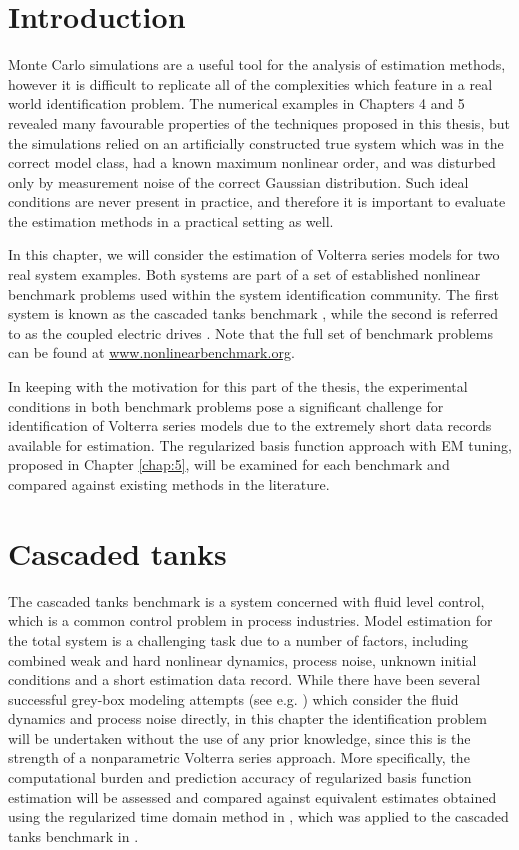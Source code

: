 \section{Introduction}

Monte Carlo simulations are a useful tool for the analysis of estimation methods, however it is difficult to replicate all of the complexities which feature in a real world identification problem. The numerical examples in Chapters 4 and 5 revealed many favourable properties of the techniques proposed in this thesis, but the simulations relied on an artificially constructed true system which was in the correct model class, had a known maximum nonlinear order, and was disturbed only by measurement noise of the correct Gaussian distribution. Such ideal conditions are never present in practice, and therefore it is important to evaluate the estimation methods in a practical setting as well.

In this chapter, we will consider the estimation of Volterra series models for two real system examples. Both systems are part of a set of established nonlinear benchmark problems used within the system identification community. The first system is known as the cascaded tanks benchmark \cite{Schoukens2016c}, while the second is referred to as the coupled electric drives \cite{Wigren2017}. Note that the full set of benchmark problems can be found at \url{www.nonlinearbenchmark.org}. 

In keeping with the motivation for this part of the thesis, the experimental conditions in both benchmark problems pose a significant challenge for identification of Volterra series models due to the extremely short data records available for estimation. The regularized basis function approach with EM tuning, proposed in Chapter \ref{chap:5}, will be examined for each benchmark and compared against existing methods in the literature.  

\section{Cascaded tanks}

The cascaded tanks benchmark \cite{Schoukens2016c} is a system concerned with fluid level control, which is a common control problem in process industries. Model estimation for the total system is a challenging task due to a number of factors, including combined weak and hard nonlinear dynamics, process noise, unknown initial conditions and a short estimation data record. While there have been several successful grey-box modeling attempts (see e.g. \cite{Pan2018}) which consider the fluid dynamics and process noise directly, in this chapter the identification problem will be undertaken without the use of any prior knowledge, since this is the strength of a nonparametric Volterra series approach. More specifically, the computational burden and prediction accuracy of regularized basis function estimation will be assessed and compared against equivalent estimates obtained using the regularized time domain method in \cite{Birpoutsoukis2017}, which was applied to the cascaded tanks benchmark in \cite{Birpoutsoukis2017b}. 

